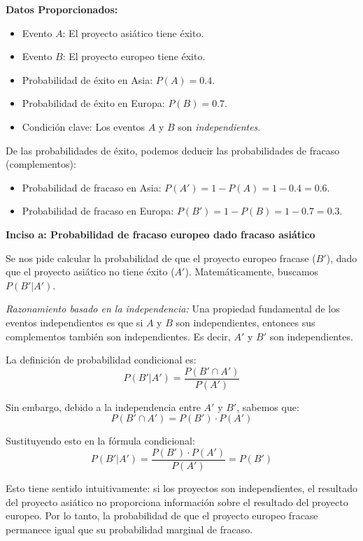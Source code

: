 \documentclass[a4paper]{article}
\begin{document}
\textbf{Datos Proporcionados:}
\begin{itemize}
    \item Evento $A$: El proyecto asiático tiene éxito.
    \item Evento $B$: El proyecto europeo tiene éxito.
    \item Probabilidad de éxito en Asia: $P(A) = 0.4$.
    \item Probabilidad de éxito en Europa: $P(B) = 0.7$.
    \item Condición clave: Los eventos $A$ y $B$ son \textit{independientes}.
\end{itemize}

De las probabilidades de éxito, podemos deducir las probabilidades de fracaso (complementos):
\begin{itemize}
    \item Probabilidad de fracaso en Asia: $P(A') = 1 - P(A) = 1 - 0.4 = 0.6$.
    \item Probabilidad de fracaso en Europa: $P(B') = 1 - P(B) = 1 - 0.7 = 0.3$.
\end{itemize}

\vspace{0.3cm}

\textbf{Inciso a: Probabilidad de fracaso europeo dado fracaso asiático}

Se nos pide calcular la probabilidad de que el proyecto europeo fracase ($B'$), dado que el proyecto asiático no tiene éxito ($A'$). Matemáticamente, buscamos $P(B' | A')$.

\textit{Razonamiento basado en la independencia:}
Una propiedad fundamental de los eventos independientes es que si $A$ y $B$ son independientes, entonces sus complementos también son independientes. Es decir, $A'$ y $B'$ son independientes.

La definición de probabilidad condicional es:
$$ P(B' | A') = \frac{P(B' \cap A')}{P(A')} $$

Sin embargo, debido a la independencia entre $A'$ y $B'$, sabemos que:
$$ P(B' \cap A') = P(B') \cdot P(A') $$

Sustituyendo esto en la fórmula condicional:
$$ P(B' | A') = \frac{P(B') \cdot P(A')}{P(A')} = P(B') $$

Esto tiene sentido intuitivamente: si los proyectos son independientes, el resultado del proyecto asiático no proporciona información sobre el resultado del proyecto europeo. Por lo tanto, la probabilidad de que el proyecto europeo fracase permanece igual que su probabilidad marginal de fracaso.
\end{document}
